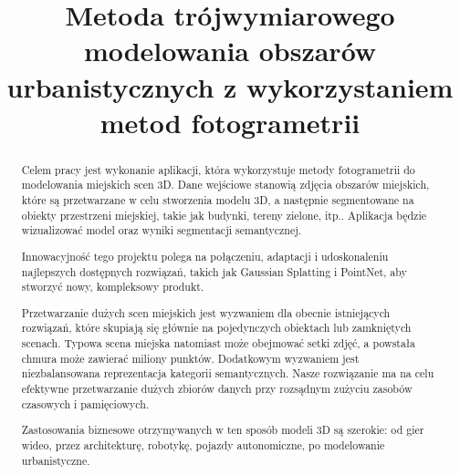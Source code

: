 \documentclass[polish,edition=2024]{zpiday}
\title{Metoda trójwymiarowego modelowania obszarów urbanistycznych z wykorzystaniem metod fotogrametrii}
\begin{document}
\maketitle

\begin{abstract}
    Celem pracy jest wykonanie aplikacji, która wykorzystuje metody fotogrametrii do modelowania miejskich scen 3D. Dane wejściowe stanowią zdjęcia obszarów miejskich, które są przetwarzane w celu stworzenia modelu 3D, a następnie segmentowane na obiekty przestrzeni miejskiej, takie jak budynki, tereny zielone, itp.. Aplikacja będzie wizualizować model oraz wyniki segmentacji semantycznej.

    Innowacyjność tego projektu polega na połączeniu, adaptacji i udoskonaleniu najlepszych dostępnych rozwiązań, takich jak Gaussian Splatting i PointNet, aby stworzyć nowy, kompleksowy produkt.

    Przetwarzanie dużych scen miejskich jest wyzwaniem dla obecnie istniejących rozwiązań, które skupiają się głównie na pojedynczych obiektach lub zamkniętych scenach. Typowa scena miejska natomiast może obejmować setki zdjęć, a powstała chmura może zawierać miliony punktów. Dodatkowym wyzwaniem jest niezbalansowana reprezentacja kategorii semantycznych. Nasze rozwiązanie ma na celu efektywne przetwarzanie dużych zbiorów danych przy rozsądnym zużyciu zasobów czasowych i pamięciowych.

    Zastosowania biznesowe otrzymywanych w ten sposób modeli 3D są szerokie: od gier wideo, przez architekturę, robotykę, pojazdy autonomiczne, po modelowanie urbanistyczne.
\end{abstract}











\end{document}
